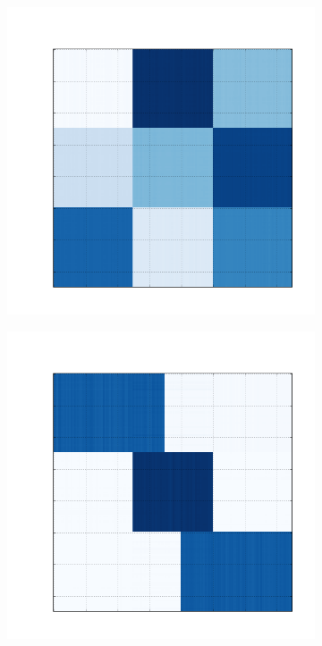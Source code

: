 \documentclass[
    12pt,                %
    oneside,            %
    a4paper,            %
    english,            %
    brazil                %
    ]{abntex2ppgsi}
\begin{document}
\begin{figure}[H]
\begin{subfigure}[b]{0.18\textwidth}
        \caption{}
    \end{subfigure}
    \begin{subfigure}[b]{0.18\textwidth}
        \includegraphics[width=\textwidth]{img/c-reconstruction-ovnmtf.png}
        \caption{}
    \end{subfigure}
    \begin{subfigure}[b]{0.18\textwidth}
        \includegraphics[width=\textwidth]{img/d-reconstruction-ovnmtf.png}

\end{subfigure}
\end{figure}
\end{document}
